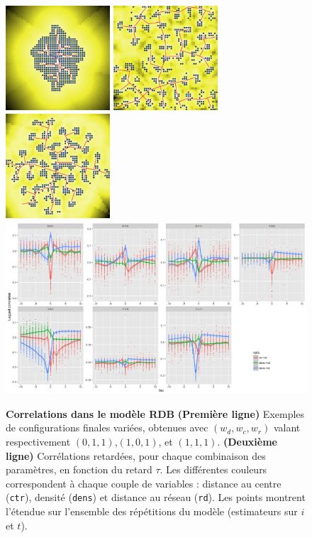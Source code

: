 \documentclass[english]{./sageo}
\begin{document}
\begin{figure}[h]
\centering
\includegraphics[width=3.9cm]{ex_60_wdens0_wroad1_wcenter1_seed272727}
\includegraphics[width=3.9cm]{ex_60_wdens1_wroad1_wcenter0_seed272727}
\includegraphics[width=3.9cm]{ex_60_wdens1_wroad1_wcenter1_seed272727}\\\vspace{0.2cm}
\includegraphics[width=12cm]{laggedcorrs_facetextreme}
\caption{\textbf{Correlations dans le modèle RDB} \textbf{(Première ligne)} Exemples de configurations finales variées, obtenues avec $(w_{d},w_{c},w_{r})$ valant respectivement $(0,1,1)$,$(1,0,1)$, et $(1,1,1)$. \textbf{(Deuxième ligne)} Corrélations retardées, pour chaque combinaison des paramètres, en fonction du retard $\tau$. Les différentes couleurs correspondent à chaque couple de variables : distance au centre (\texttt{ctr}), densité (\texttt{dens}) et distance au réseau (\texttt{rd}). Les points montrent l'étendue sur l'ensemble des répétitions du modèle (estimateurs sur $i$ et $t$).}
\label{fig:exrdb}
\end{figure}
\end{document}
